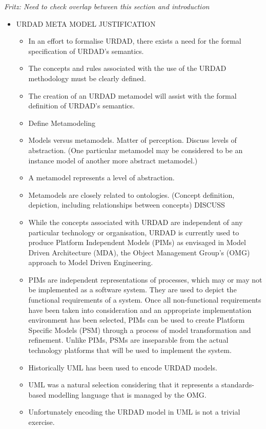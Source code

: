 {\em Fritz: Need to check overlap between this section and introduction}

\begin{itemize}

	\item URDAD META MODEL JUSTIFICATION
	\begin{itemize}
		\item In an effort to formalise URDAD, there exists a need for the formal specification of URDAD's semantics.
		\item The concepts and rules associated with the use of the URDAD methodology must be clearly defined.
		\item The creation of an URDAD metamodel will assist with the formal definition of URDAD's semantics.
		\item Define Metamodeling
		\item Models versus metamodels. Matter of perception. Discuss levels of abstraction. (One particular metamodel may be considered to be an instance model of another more abstract metamodel.) 
		\item A metamodel represents a level of abstraction.
		\item	Metamodels are closely related to ontologies. (Concept definition, depiction, including relationships between concepts) DISCUSS
		\item While the concepts associated with URDAD are independent of any particular technology or organisation, URDAD is currently used to produce Platform Independent Models (PIMs) as envisaged in Model Driven Architecture (MDA), the Object Management Group's (OMG) approach to Model Driven Engineering. 
		\item PIMs are independent representations of processes, which may or may not be implemented as a software system. They are used to depict the functional requirements of a system. Once all non-functional requirements have been taken into consideration and an appropriate implementation environment has been selected, PIMs can be used to create Platform Specific Models (PSM) through a process of model transformation and refinement. Unlike PIMs, PSMs are inseparable from the actual technology platforms that will be used to implement the system.
		\item	Historically UML has been used to encode URDAD models. 
		\item	UML was a natural selection considering that it represents a standards-based modelling language that is managed by the OMG.
		\item	Unfortunately encoding the URDAD model in UML is not a trivial exercise.

\end{itemize}
\end{itemize}
